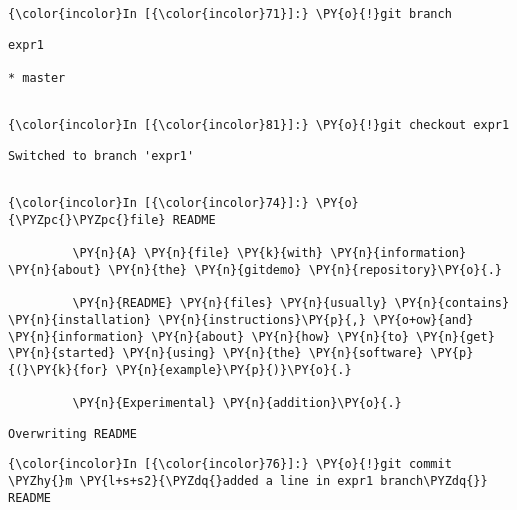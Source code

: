    \begin{Verbatim}[commandchars=\\\{\}]
{\color{incolor}In [{\color{incolor}71}]:} \PY{o}{!}git branch
\end{Verbatim}

    \begin{Verbatim}[commandchars=\\\{\}]
  expr1

* master


    \end{Verbatim}



    \begin{Verbatim}[commandchars=\\\{\}]
{\color{incolor}In [{\color{incolor}81}]:} \PY{o}{!}git checkout expr1
\end{Verbatim}

    \begin{Verbatim}[commandchars=\\\{\}]
Switched to branch 'expr1'


    \end{Verbatim}



    \begin{Verbatim}[commandchars=\\\{\}]
{\color{incolor}In [{\color{incolor}74}]:} \PY{o}{\PYZpc{}\PYZpc{}file} README
         
         \PY{n}{A} \PY{n}{file} \PY{k}{with} \PY{n}{information} \PY{n}{about} \PY{n}{the} \PY{n}{gitdemo} \PY{n}{repository}\PY{o}{.}
         
         \PY{n}{README} \PY{n}{files} \PY{n}{usually} \PY{n}{contains} \PY{n}{installation} \PY{n}{instructions}\PY{p}{,} \PY{o+ow}{and} \PY{n}{information} \PY{n}{about} \PY{n}{how} \PY{n}{to} \PY{n}{get} \PY{n}{started} \PY{n}{using} \PY{n}{the} \PY{n}{software} \PY{p}{(}\PY{k}{for} \PY{n}{example}\PY{p}{)}\PY{o}{.}
         
         \PY{n}{Experimental} \PY{n}{addition}\PY{o}{.}
\end{Verbatim}

    \begin{Verbatim}[commandchars=\\\{\}]
Overwriting README

    \end{Verbatim}

    \begin{Verbatim}[commandchars=\\\{\}]
{\color{incolor}In [{\color{incolor}76}]:} \PY{o}{!}git commit \PYZhy{}m \PY{l+s+s2}{\PYZdq{}added a line in expr1 branch\PYZdq{}} README
\end{Verbatim}

